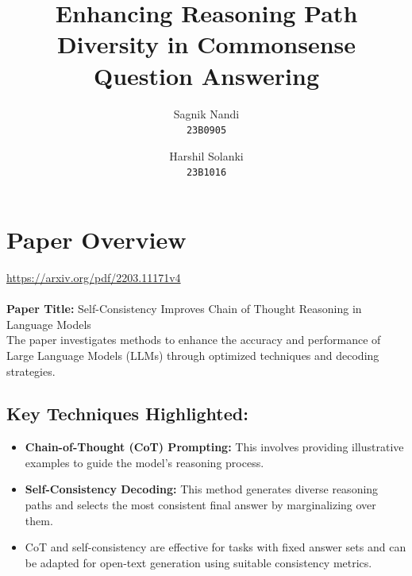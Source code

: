 \documentclass[24pt]{article}
\title{Enhancing Reasoning Path Diversity in Commonsense Question Answering}
\author{
  Sagnik Nandi\\
  \texttt{23B0905}
  \and
  Harshil Solanki\\
  \texttt{23B1016}
}
\date{}
\begin{document}
\maketitle
\tableofcontents
\clearpage



\section{Paper Overview}

\url{https://arxiv.org/pdf/2203.11171v4}\\ \\
\textbf{Paper Title:}
Self-Consistency Improves Chain of Thought Reasoning in Language Models\\

\noindent The paper investigates methods to enhance the accuracy and performance of Large Language Models (LLMs) through optimized techniques and decoding strategies.
\subsection{Key Techniques Highlighted:}
    \begin{itemize}
        \item \textbf{Chain-of-Thought (CoT) Prompting:} This involves providing illustrative examples to guide the model's reasoning process.
        \item \textbf{Self-Consistency Decoding:} This method generates diverse reasoning paths and selects the most consistent final answer by marginalizing over them.
        \item CoT and self-consistency are effective for tasks with fixed answer sets and can be adapted for open-text generation using suitable consistency metrics.
    \end{itemize}
\end{document}
